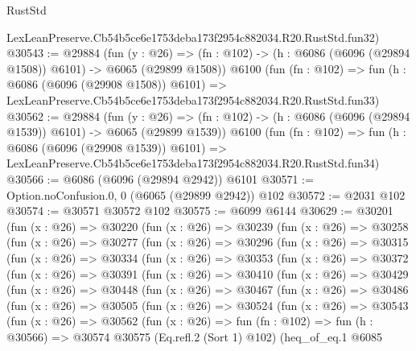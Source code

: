 \begin{lexlean}{RustStd}
\begin{coremodule}
    LexLeanPreserve.Cb54b5ce6e1753deba173f2954c882034.R20.RustStd.fun32)
@30543 := @29884
    (fun (y : @26) =>
    (fn : @102) -> (h : @6086 (@6096 (@29894 @1508)) @6101) -> @6065 (@29899 @1508))
    @6100
    (fun (fn : @102) =>
    fun (h : @6086 (@6096 (@29908 @1508)) @6101) =>
    LexLeanPreserve.Cb54b5ce6e1753deba173f2954c882034.R20.RustStd.fun33)
@30562 := @29884
    (fun (y : @26) =>
    (fn : @102) -> (h : @6086 (@6096 (@29894 @1539)) @6101) -> @6065 (@29899 @1539))
    @6100
    (fun (fn : @102) =>
    fun (h : @6086 (@6096 (@29908 @1539)) @6101) =>
    LexLeanPreserve.Cb54b5ce6e1753deba173f2954c882034.R20.RustStd.fun34)
@30566 := @6086 (@6096 (@29894 @2942)) @6101
@30571 := Option.noConfusion.{0, 0} (@6065 (@29899 @2942)) @102
@30572 := @2031 @102
@30574 := @30571 @30572 @102
@30575 := @6099 @6144
@30629 := @30201
    (fun (x : @26) =>
    @30220
      (fun (x : @26) =>
      @30239
        (fun (x : @26) =>
        @30258
          (fun (x : @26) =>
          @30277
            (fun (x : @26) =>
            @30296
              (fun (x : @26) =>
              @30315
                (fun (x : @26) =>
                @30334
                  (fun (x : @26) =>
                  @30353
                    (fun (x : @26) =>
                    @30372
                      (fun (x : @26) =>
                      @30391
                        (fun (x : @26) =>
                        @30410
                          (fun (x : @26) =>
                          @30429
                            (fun (x : @26) =>
                            @30448
                              (fun (x : @26) =>
                              @30467
                                (fun (x : @26) =>
                                @30486
                                  (fun (x : @26) =>
                                  @30505
                                    (fun (x : @26) =>
                                    @30524
                                      (fun (x : @26) =>
                                      @30543
                                        (fun (x : @26) =>
                                        @30562
                                          (fun (x : @26) =>
                                          fun (fn : @102) =>
                                          fun (h : @30566) =>
                                          @30574
                                            @30575
                                            (Eq.refl.{2} (Sort 1) @102)
                                            (heq_of_eq.{1}
                                              @6085

\end{coremodule}
\end{lexlean}
